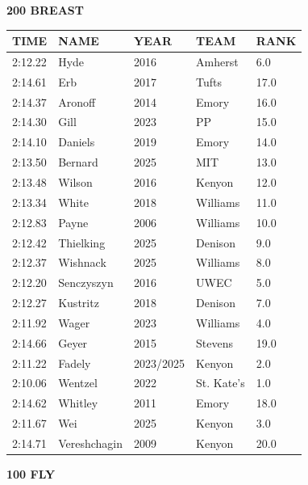 \begin{table}[H]
\centering
\begin{minipage}[t]{0.48\textwidth}
\centering
\textbf{200 BREAST}\\[0.1cm]
\begin{tabular}{@{}p{1.8cm}p{2.8cm}p{1.2cm}p{1.4cm}p{0.8cm}@{}}
\hline
    \textbf{TIME} & \textbf{NAME} & \textbf{YEAR} & \textbf{TEAM} & \textbf{RANK} \\
\hline
    2:12.22 & Hyde & 2016 & Amherst & 6.0 \\
    2:14.61 & Erb & 2017 & Tufts & 17.0 \\
    2:14.37 & Aronoff & 2014 & Emory & 16.0 \\
    2:14.30 & Gill & 2023 & PP & 15.0 \\
    2:14.10 & Daniels & 2019 & Emory & 14.0 \\
    2:13.50 & Bernard & 2025 & MIT & 13.0 \\
    2:13.48 & Wilson & 2016 & Kenyon & 12.0 \\
    2:13.34 & White & 2018 & Williams & 11.0 \\
    2:12.83 & Payne & 2006 & Williams & 10.0 \\
    2:12.42 & Thielking & 2025 & Denison & 9.0 \\
    2:12.37 & Wishnack & 2025 & Williams & 8.0 \\
    2:12.20 & Senczyszyn & 2016 & UWEC & 5.0 \\
    2:12.27 & Kustritz & 2018 & Denison & 7.0 \\
    2:11.92 & Wager & 2023 & Williams & 4.0 \\
    2:14.66 & Geyer & 2015 & Stevens & 19.0 \\
    2:11.22 & Fadely & 2023/2025 & Kenyon & 2.0 \\
    2:10.06 & Wentzel & 2022 & St. Kate's & 1.0 \\
    2:14.62 & Whitley & 2011 & Emory & 18.0 \\
    2:11.67 & Wei & 2025 & Kenyon & 3.0 \\
    2:14.71 & Vereshchagin & 2009 & Kenyon & 20.0 \\
\hline
\end{tabular}
\end{minipage}\hfill
\begin{minipage}[t]{0.48\textwidth}
\centering
\textbf{100 FLY}\\[0.1cm]
\begin{tabular}{@{}p{1.8cm}p{2.8cm}p{1.2cm}p{1.4cm}p{0.8cm}@{}}

\end{tabular}
\end{minipage}
\end{table}

